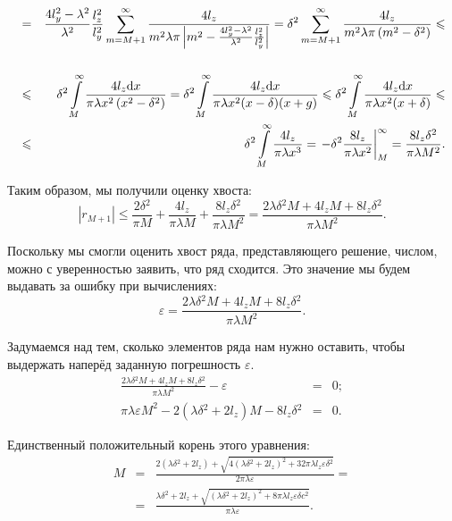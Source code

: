 \begin{eqnarray*}
  \\
  &=& \frac{4l_y^2 - \lambda^2}{\lambda^2} \frac{l_z^2}{l_y^2} \sum \limits_{m=M+1}^{\infty} \frac{4 l_z}{m^2 \lambda \pi \left| m^2 - \frac{4l_y^2 - \lambda^2}{\lambda^2} \frac{l_z^2}{l_y^2} \right|} = \delta{}^2 \sum \limits_{m=M+1}^{\infty} \frac{4 l_z}{m^2 \lambda \pi \left( m^2 - \delta{}^2 \right)} \leqslant \\
  \\
  &\leqslant& \delta{}^2 \int \limits_M^{\infty} \frac{4 l_z \mathrm{d} x}{\pi \lambda x^2 \left( x^2 - \delta{}^2 \right)} = 
  \delta{}^2 \int \limits_M^{\infty} \frac{4 l_z \mathrm{d} x}{\pi \lambda x^2 (x - \delta{}) (x + g)} \leqslant
  \delta{}^2 \int \limits_M^{\infty} \frac{4 l_z \mathrm{d} x}{\pi \lambda x^2 (x + \delta{})} \leqslant \\
  &\leqslant& \delta{}^2 \int \limits_M^{\infty} \frac{4 l_z}{\pi \lambda x^3} =
  \left. - \delta{}^2 \frac{8 l_z}{\pi \lambda x^2} \right|_M^{\infty} =
  \frac{8 l_z \delta{}^2}{\pi \lambda M^2}.
\end{eqnarray*}


Таким образом, мы получили оценку хвоста: \\
\[
\left| r_{M+1} \right| \leq \frac{2 \delta{}^2}{\pi M} + \frac{4 l_z}{\pi \lambda M} + \frac{8 l_z \delta{}^2}{\pi \lambda M^2} = \frac{2 \lambda \delta{}^2 M + 4 l_z M + 8 l_z \delta{}^2}{\pi \lambda M^2}.
\]

Поскольку мы смогли оценить хвост ряда, представляющего решение, числом, можно с уверенностью заявить, что ряд сходится.
Это значение мы будем выдавать за ошибку при вычислениях:\\
\[
\varepsilon = \frac{2 \lambda \delta{}^2 M + 4 l_z M + 8 l_z \delta{}^2}{\pi \lambda M^2}.
\]

Задумаемся над тем, сколько элементов ряда нам нужно оставить, чтобы выдержать наперёд заданную погрешность $\varepsilon$.
\begin{eqnarray*}
\frac{2 \lambda \delta{}^2 M + 4 l_z M + 8 l_z \delta{}^2}{\pi \lambda M^2} - \varepsilon &=& 0;\\
\pi \lambda \varepsilon M^2 - 2 \left( \lambda \delta{}^2 + 2 l_z \right) M - 8 l_z \delta{}^2 &=& 0.
\end{eqnarray*}

Единственный положительный корень этого уравнения:
\begin{eqnarray*}
  M &=& \frac{2 \left( \lambda \delta{}^2 + 2 l_z \right) + \sqrt{4 \left( \lambda \delta{}^2 + 2 l_z \right)^2 + 32 \pi \lambda l_z \varepsilon \delta{}^2}}{2 \pi \lambda \varepsilon} =\\
  &=&\frac{\lambda \delta{}^2 + 2 l_z + \sqrt{\left( \lambda \delta{}^2 + 2 l_z \right)^2 + 8 \pi \lambda l_z \varepsilon \delta{} c^2}}{\pi \lambda \varepsilon}.
\end{eqnarray*}

